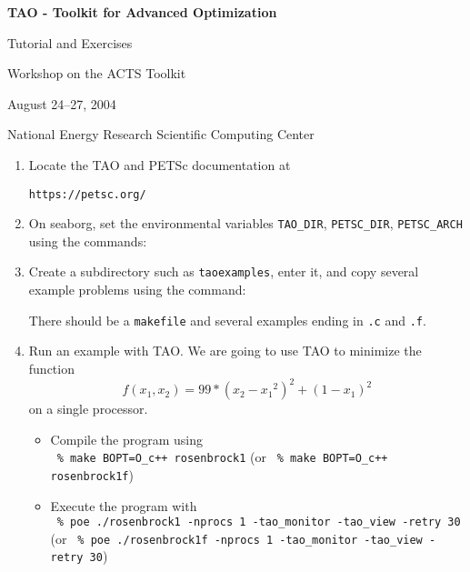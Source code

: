 \documentclass[11pt]{article}
\begin{document}
\begin{center}
{\bf
TAO - Toolkit for Advanced Optimization

Tutorial and Exercises

\vspace{0.25in}

Workshop on the ACTS Toolkit

August 24--27, 2004

National Energy Research Scientific Computing Center
}
\end{center}
\vspace{0.25in}

\begin{enumerate}

\item Locate the TAO and PETSc documentation at
\begin{alltt}
https://petsc.org/
\end{alltt}

\item On seaborg, set the environmental variables
\texttt{TAO\_DIR}, \texttt{PETSC\_DIR}, \texttt{PETSC\_ARCH}
using the commands:
\begin{alltt}
% module load tao/1.7
% module load petsc/2.2.1
\end{alltt}

\item Create a subdirectory such as \texttt{taoexamples}, enter it, and copy several example problems using the
command:
\begin{alltt}
% mkdir taoexamples
% cd taoexamples
% cp -R \$TAO_DIR/src/unconstrained/tutorials/* .
% ls
\end{alltt}
There should be a \texttt{makefile} and several examples ending in \texttt{.c} and \texttt{.f}.

\item Run an example with TAO.
We are going to use TAO to minimize the function
\[
    f(x_1,x_2) = 99*(x_2-{x_1}^2)^2 + (1-x_1)^2
\]
on a single processor.
\begin{itemize}

 \item Compile the program using \\
  \quad \texttt{ \% make BOPT=O\_c++ rosenbrock1}
  (or \texttt{ \% make BOPT=O\_c++ rosenbrock1f})

 \item Execute the program with \\
  \quad \texttt{ \% poe ./rosenbrock1 -nprocs 1 -tao\_monitor -tao\_view -retry 30} (or
  \texttt{ \% poe ./rosenbrock1f -nprocs 1 -tao\_monitor -tao\_view -retry 30})


\end{itemize}
\end{enumerate}
\end{document}
